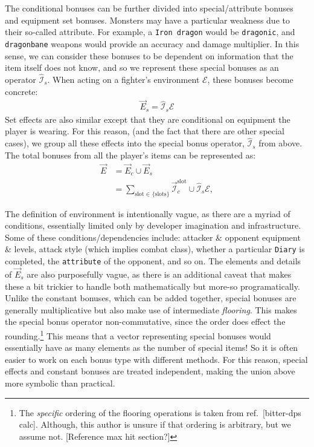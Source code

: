 		The conditional bonuses can be further divided into special/attribute bonuses and equipment set bonuses. Monsters may have a particular weakness due to their so-called attribute. For example, a \texttt{Iron dragon} would be \texttt{dragonic}, and \texttt{dragonbane} weapons would provide an accuracy and damage multiplier. In this sense, we can consider these bonuses to be dependent on information that the item itself does not know, and so we represent these special bonuses as an operator $\hat{\mathcal{I}}_s$. When acting on a fighter's environment $\mathcal{E}$, these bonuses become concrete:
		\begin{align}
			\vec{E}_s = \hat{\mathcal{I}}_s \mathcal{E}
		\end{align}
		Set effects are also similar except that they are conditional on equipment the player is wearing. For this reason, (and the fact that there are other special cases), we group all these effects into the special bonus operator, $\hat{\mathcal{I}}_s$ from above.
		The total bonuses from all the player's items can be represented as:
		\begin{align}
			\vec{E} &= \vec{E}_c \cup \vec{E}_s\\
			&= \sum_{\text{slot $\in$ \{slots\}}} \vec{\mathcal{I}}^\text{slot}_c \cup \hat{\mathcal{I}}_s \mathcal{E},
		\end{align}

		The definition of environment is intentionally vague, as there are a myriad of conditions, essentially limited only by developer imagination and infrastructure. Some of these conditions/dependencies include: attacker \& opponent equipment \& levels, attack style (which implies combat class), whether a particular \texttt{Diary} is completed, the \texttt{attribute} of the opponent, and so on. The elements and details of $\vec{E}_s$ are also purposefully vague, as there is an additional caveat that makes these a bit trickier to handle both mathematically but more-so programatically. Unlike the constant bonuses, which can be added together, special bonuses are generally multiplicative but also make use of intermediate \textit{flooring}. This makes the special bonus operator non-commutative, since the order does effect the rounding.\footnote{The \textit{specific} ordering of the flooring operations is taken from ref.~[bitter-dps calc]. Although, this author is unsure if that ordering is arbitrary, but we assume not. [Reference max hit section?]} This means that a vector representing special bonuses would essentially have as many elements as the number of special items! So it is often easier to work on each bonus type with different methods. For this reason, special effects and constant bonuses are treated independent, making the union above more symbolic than practical.


